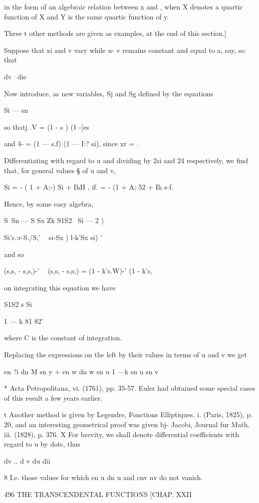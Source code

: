 in the form of an algebraic relation between x and , when X denotes a
quartic function of X and Y is the same quartic function of y.

Three t other methods are given as examples, at the end of this
section.]

Suppose that xi and v vary while u- v remains constant and equal to a,
say, so that

dv \ die

Now introduce, as new variables, Sj and Sg defined by the equations

Si — sn %

so thatj .V = (1 - s ) (1 -]es \

and 4- = (1 — s.f) (1 — I:? si), since xr = .

Differentiating with regard to u and dividing by 2si and 24
respectively, we find that, for general values § of u and v,

Si = - ( 1 + A;-) Si + IhH , if. = - (1 + A; 52 + Ih s-f.

Hence, by some easy algebra,

S\ Sn — S Sx Zk S1S2 \ Si — 2 )

Si's.:r-S./S,' ~ si-Sx ) l-k'Sx si) '

and so

(s,s, - s,s,)-' ~ (s,s, - s,s;) = (1 - k's.W)-' (1 - k's,%

on integrating this equation we have

S1S2 s Si

1 — k 81 82'

where C is the constant of integration.

Replacing the expressions on the left by their values in terms of u
and v we get \

en ?i dn M sn y + en w dn w sn u 1 —k sn u sn v

* Acta Petropolitana, vi. (1761), pp. 35-57. Euler had obtaiued some
special cases of this result a few years earlier.

t Another method is given by Legendre, Fonctions Elliptiques, i.
(Paris, 1825), p. 20, and an interesting geometrical proof was given
bj- Jacobi, Journal fur Math. iii. (1828), p. 376. X For brevity, we
shall denote differential coefficients with regard to u by dots, thus

dv .. d v du dii

8 I.e. those values for which en u dn u and cnv nv do not vanish.

496 THE TRANSCENDENTAL FUNCTIONS [CHAP. XXII

